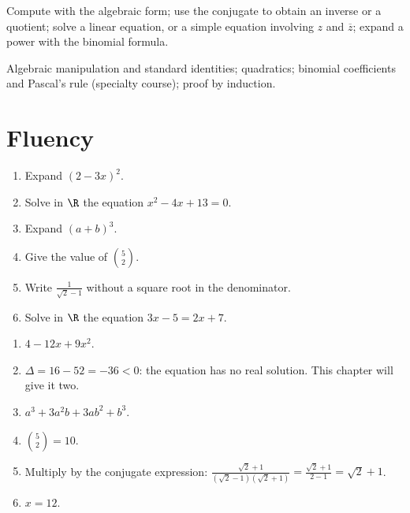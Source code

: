 
\begin{objectives}
Compute with the algebraic form; use the conjugate to obtain an inverse or a quotient; solve a linear equation, or a simple equation involving $z$ and $\overline{z}$; expand a power with the binomial formula.
\end{objectives}
\begin{prerequisites}
Algebraic manipulation and standard identities; quadratics; binomial coefficients and Pascal's rule (specialty course); proof by induction.
\end{prerequisites}

\section{Fluency}
\begin{fluency}
\begin{enumerate}
\item Expand $(2-3x)^2$.
\item Solve in $\R$ the equation $x^2-4x+13=0$.
\item Expand $(a+b)^3$.
\item Give the value of $\binom{5}{2}$.
\item Write $\frac{1}{\sqrt2-1}$ without a square root in the denominator.
\item Solve in $\R$ the equation $3x-5=2x+7$.
\end{enumerate}
\end{fluency}
\begin{solution}[Fluency]
\begin{enumerate}
\item $4-12x+9x^2$.
\item $\Delta=16-52=-36<0$: the equation has no real solution. This chapter will give it two.
\item $a^3+3a^2b+3ab^2+b^3$.
\item $\binom{5}{2}=10$.
\item Multiply by the conjugate expression: $\frac{\sqrt2+1}{(\sqrt2-1)(\sqrt2+1)}=\frac{\sqrt2+1}{2-1}=\sqrt2+1$.
\item $x=12$.
\end{enumerate}
\end{solution}

